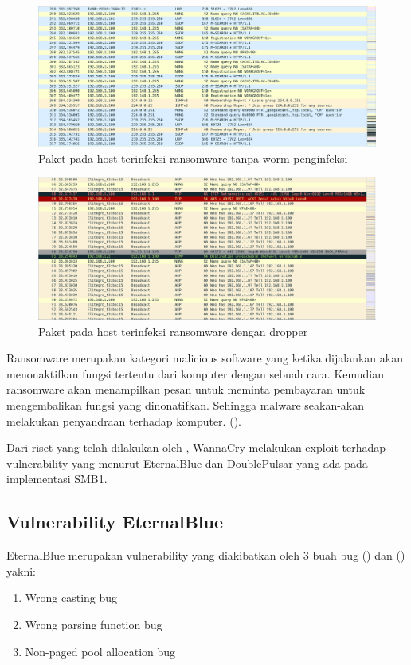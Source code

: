 \begin{figure}[H]
	\centering
	\includegraphics[width=\textwidth]{resources/no_infect_action.png}
	\caption{Paket pada host terinfeksi ransomware tanpa worm penginfeksi}
	\label{fig:no_infect_action}
\end{figure}

\begin{figure}[H]
	\centering
	\includegraphics[width=\textwidth]{resources/infect_action.png}
	\caption{Paket pada host terinfeksi ransomware dengan dropper}
	\label{fig:infect_action}
\end{figure}

Ransomware merupakan kategori malicious software yang ketika dijalankan akan menonaktifkan fungsi tertentu dari komputer dengan sebuah cara. Kemudian ransomware akan menampilkan pesan untuk meminta pembayaran untuk mengembalikan fungsi yang dinonatifkan. Sehingga malware seakan-akan melakukan penyandraan terhadap komputer. (\cite{o2012ransomware}).

Dari riset yang telah dilakukan oleh \cite{islam2018smb}, WannaCry melakukan exploit terhadap vulnerability yang menurut EternalBlue dan DoublePulsar yang ada pada implementasi SMB1.

\subsection{Vulnerability EternalBlue}
EternalBlue merupakan vulnerability yang diakibatkan oleh 3 buah bug (\cite{islam2018smb}) dan (\cite{grossman2017check}) yakni:
\begin{enumerate}
	\item Wrong casting bug
	\item Wrong parsing function bug
	\item Non-paged pool allocation bug
\end{enumerate}

